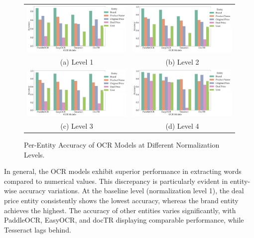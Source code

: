 \documentclass[11pt]{article}
\begin{document}
\begin{figure}
    \begin{tabular}{cc}
      \includegraphics[width=0.5\linewidth]{figures/accuracy_level_1.png} &   \includegraphics[width=0.5\linewidth]{figures/accuracy_level_2.png} \\
    (a) Level 1 & (b) Level 2 \\[6pt]
     \includegraphics[width=0.5\linewidth]{figures/accuracy_level_3.png} &   \includegraphics[width=0.5\linewidth]{figures/accuracy_level_4.png} \\
    (c) Level 3 & (d) Level 4 \\[6pt]
    \end{tabular}
    \caption{Per-Entity Accuracy of OCR Models at Different Normalization Levels.}
    \label{fig:eval_ocr_accuracies}
    \end{figure}

In general, the OCR models exhibit superior performance in extracting words compared to numerical values. This discrepancy is particularly evident in entity-wise accuracy variations. At the baseline level (normalization level 1), the deal price entity consistently shows the lowest accuracy, whereas the brand entity achieves the highest. The accuracy of other entities varies significantly, with PaddleOCR, EasyOCR, and docTR displaying comparable performance, while Tesseract lags behind.
\end{document}
